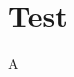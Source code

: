 \documentclass[letterpaper, 12pt]{report}
\begin{document}
\chapter{Test}

\noindent A
\end{document}
